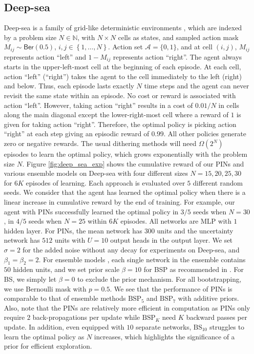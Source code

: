 \documentclass[letterpaper]{article} %
\newcommand{\Sp}[1]{\left(#1\right)}
\newcommand{\Bp}[1]{\left\{#1\right\}}
\theoremstyle{definition}
\begin{document}
\subsection{Deep-sea}
Deep-sea is a family of grid-like deterministic environments \cite{osband2017deep}, which are indexed by a problem size $N \in \mathbb{N}$, with $N \times N$ cells as states, and sampled action mask $M_{ij}\sim\mathsf{Ber}(0.5)$, $i, j\in\Bp{1, \dots, N}$. Action set $\mathcal{A} = \{0, 1\}$, and at cell $\Sp{i, j}$, $M_{ij}$ represents action ``left'' and $1-M_{ij}$ represents action ``right''. The agent always starts in the upper-left-most cell at the beginning of each episode. At each cell, action ``left'' (``right'') takes the agent to the cell immediately to the left (right) and below. Thus, each episode lasts exactly $N$ time steps and the agent can never revisit the same state within an episode. No cost or reward is associated with action ``left''. However, taking action ``right'' results in a cost of $0.01/N$ in cells along the main diagonal except the lower-right-most cell where a reward of $1$ is given for taking action ``right''. Therefore, the optimal policy is picking action ``right'' at each step giving an episodic reward of $0.99$. All other policies generate zero or negative rewards. The usual dithering methods will need $\Omega\Sp{2^N}$ episodes to learn the optimal policy, which grows exponentially with the problem size $N$.  Figure \ref{fig:deep_sea_exp} shows the cumulative reward of our PINs and various ensemble models on Deep-sea with four different sizes $N = 15, 20, 25, 30$ for $6K$ episodes of learning. Each approach is evaluated over $5$ different random seeds. We consider that the agent has learned the optimal policy when there is a linear increase in cumulative reward by the end of training. For example, our agent with PINs successfully learned the optimal policy in $3/5$ seeds when $N = 30$, in $4/5$ seeds when $N = 25$ within $6K$ episodes. All networks are MLP with $1$ hidden layer. For PINs, the mean network has $300$ units and the uncertainty network has $512$ units with $U=10$ output heads in the output layer. We set $\sigma = 2$ for the added noise without any decay for experiments on Deep-sea, and $\beta_1 = \beta_2 = 2$. For ensemble models \cite{osband2018randomized}, each single network in the ensemble contains $50$ hidden units, and we set prior scale $\beta=10$ for BSP as recommended in \cite{osband2018randomized}. For BS, we simply let $\beta=0$ to exclude the prior mechanism. For all bootstrapping, we use Bernoulli mask with $p = 0.5$. We see that the performance of PINs is comparable to that of ensemble methods $\mathrm{BSP}_5$ and $\mathrm{BSP}_7$ with additive priors. Also, note that the PINs are relatively more efficient in computation as PINs only require $2$ back-propagations per update while $\mathrm{BSP}_K$ need $K$ backward passes per update. In addition, even equipped with $10$ separate networks, $\mathrm{BS}_{10}$ struggles to learn the optimal policy as $N$ increases, which highlights the significance of a prior for efficient exploration.
\end{document}
